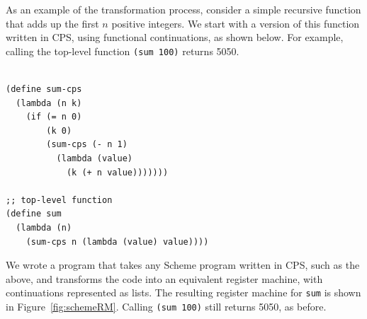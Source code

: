 \documentclass[acmsmall,screen,authorversion]{acmart}
\begin{document}
As an example of the transformation process, consider a simple recursive
function that adds up the first $n$ positive integers.  We start with a version
of this function written in CPS, using functional continuations, as shown
below.  For example, calling the top-level function \texttt{(sum 100)} returns
5050.\\\\

{\small
\begin{verbatim}
(define sum-cps
  (lambda (n k)
    (if (= n 0)
        (k 0)
        (sum-cps (- n 1)
          (lambda (value)
            (k (+ n value)))))))

;; top-level function
(define sum
  (lambda (n)
    (sum-cps n (lambda (value) value))))

\end{verbatim}
}

\noindent
We wrote a program that takes any Scheme program written in CPS, such as the
above, and transforms the code into an equivalent register machine, with
continuations represented as lists.  The resulting register machine for
\texttt{sum} is shown in Figure~\ref{fig:schemeRM}.  Calling \texttt{(sum 100)}
still returns 5050, as before.

\end{document}
